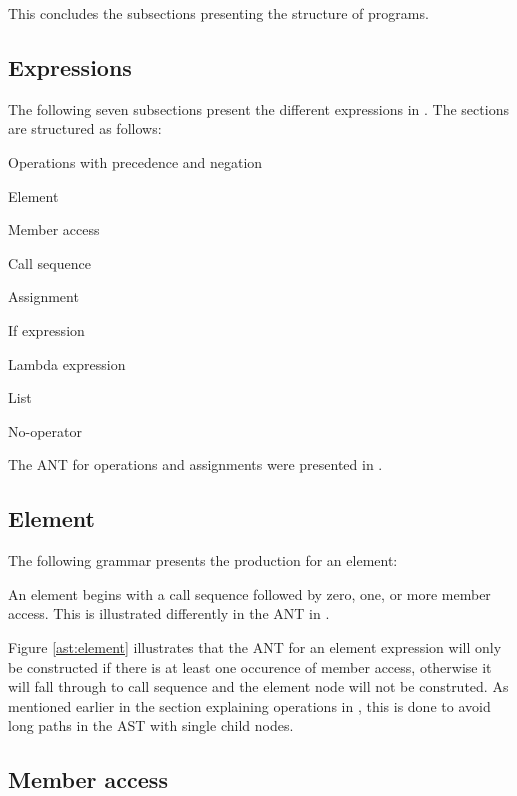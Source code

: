 This concludes the subsections presenting the structure of programs.

\subsection{Expressions}
The following seven subsections present the different expressions in
\productname{}. The sections are structured as follows:

\begin{dlist}
  \item Operations with precedence and negation
  \item Element
  \item Member access
  \item Call sequence
  \item Assignment
  \item If expression
  \item Lambda expression
  \item List
  \item No-operator
\end{dlist}

The ANT for operations and assignments were presented in .

\subsection{Element}
The following grammar presents the production for an element:

\begin{ebnf}
\end{ebnf}

An element begins with a call sequence followed by zero, one, or more member
access. This is illustrated differently in the ANT in .



Figure \ref{ast:element} illustrates that the ANT for an element expression will
only be constructed if there is at least one occurence of member access,
otherwise it will fall through to call sequence and the element node will not be
construted. As mentioned earlier in the section explaining operations in
\productname{}, this is done to avoid long paths in the AST with single child
nodes.

\subsection{Member access}

